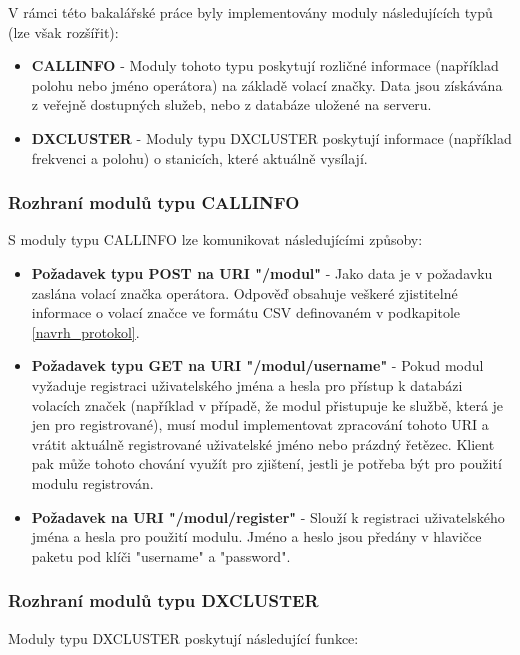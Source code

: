 V rámci této bakalářské práce byly implementovány moduly následujících typů (lze
však rozšířit):

\begin{itemize}
\item \textbf{CALLINFO} - Moduly tohoto typu poskytují rozličné informace (například polohu nebo jméno operátora)
na základě volací značky. Data jsou získávána z veřejně dostupných služeb, nebo z databáze uložené na serveru.
\item \textbf{DXCLUSTER} - Moduly typu DXCLUSTER poskytují informace (například frekvenci a polohu) o stanicích,
které aktuálně vysílají.
\end{itemize}

\subsubsection{Rozhraní modulů typu CALLINFO}

S moduly typu CALLINFO lze komunikovat následujícími způsoby:

\begin{itemize}
\item \textbf{Požadavek typu POST na URI "/modul"} - %
Jako data je v požadavku zaslána volací značka operátora. Odpověď obsahuje
veškeré zjistitelné informace o volací značce ve formátu CSV definovaném v podkapitole \ref{navrh_protokol}.
\item \textbf{Požadavek typu GET na URI "/modul/username"} - %
Pokud modul vyžaduje registraci uživatelského jména a hesla pro
přístup k databázi volacích značek (například v případě, že modul přistupuje ke službě, která je jen pro registrované), musí modul
implementovat zpracování tohoto URI a vrátit aktuálně registrované uživatelské jméno nebo prázdný řetězec. Klient pak může tohoto
chování využít pro zjištení, jestli je potřeba být pro použití modulu registrován.
\item \textbf{Požadavek na URI "/modul/register"} - Slouží k registraci uživatelského jména a hesla pro použití modulu.
Jméno a heslo jsou předány v hlavičce paketu pod klíči "username" a "password".
\end{itemize}

\subsubsection{Rozhraní modulů typu DXCLUSTER}

Moduly typu DXCLUSTER poskytují následující funkce:

